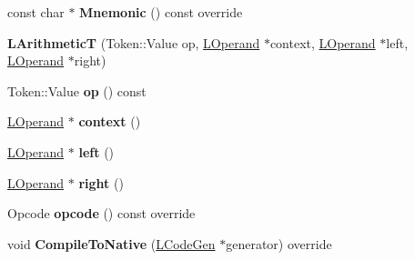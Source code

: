 \begin{DoxyCompactItemize}
\item 
const char $\ast$ {\bfseries Mnemonic} () const  override\hypertarget{classv8_1_1internal_1_1_l_arithmetic_t_abaa7a014d65c1b89c93ab7fc44003c15}{}\label{classv8_1_1internal_1_1_l_arithmetic_t_abaa7a014d65c1b89c93ab7fc44003c15}

\item 
{\bfseries L\+ArithmeticT} (Token\+::\+Value op, \hyperlink{classv8_1_1internal_1_1_l_operand}{L\+Operand} $\ast$context, \hyperlink{classv8_1_1internal_1_1_l_operand}{L\+Operand} $\ast$left, \hyperlink{classv8_1_1internal_1_1_l_operand}{L\+Operand} $\ast$right)\hypertarget{classv8_1_1internal_1_1_l_arithmetic_t_aed09089ca0bd6bd7614897b04b1d89d6}{}\label{classv8_1_1internal_1_1_l_arithmetic_t_aed09089ca0bd6bd7614897b04b1d89d6}

\item 
Token\+::\+Value {\bfseries op} () const \hypertarget{classv8_1_1internal_1_1_l_arithmetic_t_ab6979d3ffa80748d912d58539cfe971c}{}\label{classv8_1_1internal_1_1_l_arithmetic_t_ab6979d3ffa80748d912d58539cfe971c}

\item 
\hyperlink{classv8_1_1internal_1_1_l_operand}{L\+Operand} $\ast$ {\bfseries context} ()\hypertarget{classv8_1_1internal_1_1_l_arithmetic_t_ab306728ac49c78f6fe8eec0faafec98d}{}\label{classv8_1_1internal_1_1_l_arithmetic_t_ab306728ac49c78f6fe8eec0faafec98d}

\item 
\hyperlink{classv8_1_1internal_1_1_l_operand}{L\+Operand} $\ast$ {\bfseries left} ()\hypertarget{classv8_1_1internal_1_1_l_arithmetic_t_a62140bad6c260c92f8c86d7083874a9c}{}\label{classv8_1_1internal_1_1_l_arithmetic_t_a62140bad6c260c92f8c86d7083874a9c}

\item 
\hyperlink{classv8_1_1internal_1_1_l_operand}{L\+Operand} $\ast$ {\bfseries right} ()\hypertarget{classv8_1_1internal_1_1_l_arithmetic_t_ad65b8493527788115befa0634f9de1ae}{}\label{classv8_1_1internal_1_1_l_arithmetic_t_ad65b8493527788115befa0634f9de1ae}

\item 
Opcode {\bfseries opcode} () const  override\hypertarget{classv8_1_1internal_1_1_l_arithmetic_t_a8fb5ae23dc6ddac5a72adfe9028fb08d}{}\label{classv8_1_1internal_1_1_l_arithmetic_t_a8fb5ae23dc6ddac5a72adfe9028fb08d}

\item 
void {\bfseries Compile\+To\+Native} (\hyperlink{classv8_1_1internal_1_1_l_code_gen}{L\+Code\+Gen} $\ast$generator) override\hypertarget{classv8_1_1internal_1_1_l_arithmetic_t_a2ca63e96840eacc1494d0d39ebe782a5}{}\label{classv8_1_1internal_1_1_l_arithmetic_t_a2ca63e96840eacc1494d0d39ebe782a5}


\end{DoxyCompactItemize}
